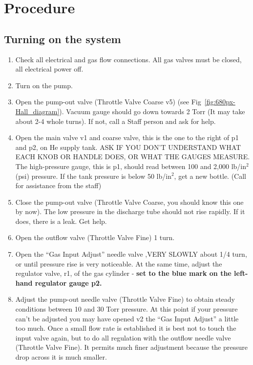 \documentclass{../lab}
\begin{document}
\section{Procedure}

\subsection{Turning on the system}

\begin{enumerate}
    \item Check all electrical and gas flow connections. All gas valves must be closed, all electrical power off.

    \item Turn on the pump.

    \item Open the pump-out valve (Throttle Valve Coarse v5) (see Fig~\ref{fig:680px-Hall_diagram}). Vacuum gauge should go down towards 2 Torr (It may take about 2-4 whole turns). If not, call a Staff person and ask for help.

    \item Open the main valve v1 and coarse valve, this is the one to the right of p1 and p2, on He supply tank. ASK IF YOU DON'T UNDERSTAND WHAT EACH KNOB OR HANDLE DOES, OR WHAT THE GAUGES MEASURE. The high-pressure gauge, this is p1, should read between 100 and 2,000 lb/in$^2$ (psi) pressure. If the tank pressure is below 50 lb/in$^2$, get a new bottle. (Call for assistance from the staff)

    \item Close the pump-out valve (Throttle Valve Coarse, you should know this one by now). The low pressure in the discharge tube should not rise rapidly. If it does, there is a leak. Get help.

    \item Open the outflow valve (Throttle Valve Fine) 1 turn.

    \item Open the ``Gas Input Adjust'' needle valve ,VERY SLOWLY about 1/4 turn, or until pressure rise is very noticeable. At the same time, adjust the regulator valve, r1, of the gas cylinder - \textbf{set to the blue mark on the left-hand regulator gauge p2.}

    \item Adjust the pump-out needle valve (Throttle Valve Fine) to obtain steady conditions between 10 and 30 Torr pressure. At this point if your pressure can't be adjusted you may have opened v2 the ``Gas Input Adjust'' a little too much. Once a small flow rate is established it is best not to touch the input valve again, but to do all regulation with the outflow needle valve (Throttle Valve Fine). It permits much finer adjustment because the pressure drop across it is much smaller.


\end{enumerate}
\end{document}
